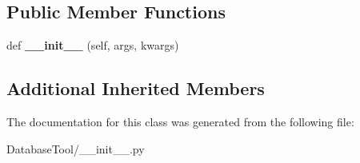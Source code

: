 \subsection*{Public Member Functions}
\begin{DoxyCompactItemize}
\item 
\mbox{\label{classMIS_1_1DatabaseTool_1_1Cormis__DataReader__hdf_abebb41818e0f726baa51b8b6c675a0d0}} 
def {\bfseries \+\_\+\+\_\+init\+\_\+\+\_\+} (self, args, kwargs)
\end{DoxyCompactItemize}
\subsection*{Additional Inherited Members}


The documentation for this class was generated from the following file\+:\begin{DoxyCompactItemize}
\item 
Database\+Tool/\+\_\+\+\_\+init\+\_\+\+\_\+.\+py\end{DoxyCompactItemize}
